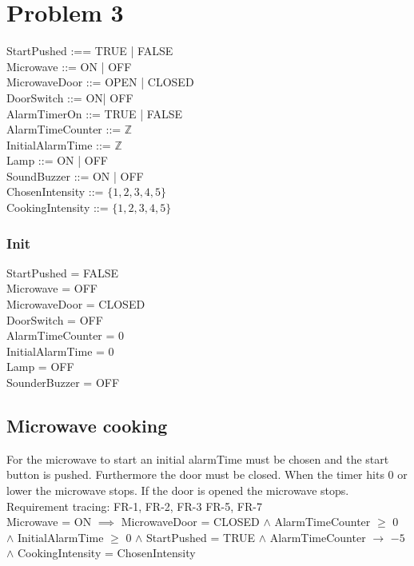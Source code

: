 


\chapter{Problem 3}

StartPushed :== TRUE | FALSE \\
Microwave ::= ON | OFF  \\
MicrowaveDoor ::= OPEN | CLOSED \\
DoorSwitch ::= ON| OFF \\
AlarmTimerOn ::= TRUE | FALSE\\
AlarmTimeCounter ::= $\mathbb{Z}$ \\
InitialAlarmTime ::= $\mathbb{Z}$ \\
Lamp ::= ON | OFF \\
SoundBuzzer ::= ON | OFF \\
ChosenIntensity ::= $\{1,2,3,4,5\}$ \\
CookingIntensity ::= $\{1,2,3,4,5\}$ \\

\subsection{Init}

StartPushed = FALSE \\
Microwave = OFF \\
MicrowaveDoor = CLOSED \\
DoorSwitch = OFF \\
AlarmTimeCounter = 0 \\
InitialAlarmTime = 0 \\
Lamp = OFF \\
SounderBuzzer = OFF \\

\section{Microwave cooking}
For the microwave to start an initial alarmTime must be chosen and the start button is pushed. Furthermore the door must be closed. When the timer hits 0 or lower the microwave stops. If the door is opened the microwave stops. \\

Requirement tracing: FR-1, FR-2, FR-3 FR-5, FR-7\\

Microwave = ON $\implies$ MicrowaveDoor = CLOSED $\wedge$ AlarmTimeCounter $\geq$ 0 $\wedge$ InitialAlarmTime $\geq$ 0  $\wedge$ StartPushed = TRUE $\wedge$ AlarmTimeCounter $\rightarrow$ $-5$ $\wedge$ CookingIntensity = ChosenIntensity


